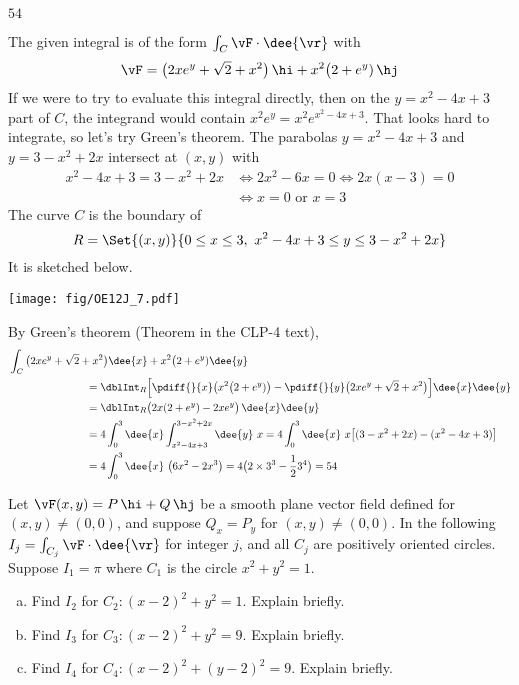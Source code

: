 \begin{answer}
$54$
\end{answer}

\begin{solution}
The given integral is of the form $\int_C \vF\cdot\dee{\vr}$
with
\begin{equation*}
\vF = \big(2xe^y + \sqrt{2} + x^2\big)\,\hi
      + x^2 \big(2 + e^y)\,\hj
\end{equation*}
If we were to try to evaluate this integral directly, then on the
$y=x^2-4x+3$ part of $C$, the
integrand would contain $x^2 e^y = x^2 e^{x^2-4x+3}$. That looks hard to integrate, so let's try Green's theorem.
The parabolas $y = x^2 - 4x + 3$ and $y = 3 - x^2 + 2x$
intersect at $(x,y)$ with
\begin{align*}
x^2 - 4x + 3 = 3 - x^2 + 2x
&\iff
2x^2 -6x = 0
\iff
2x(x-3)=0 \\
&\iff
x=0\text{ or }x=3
\end{align*}
The curve $C$ is the boundary
of
\begin{equation*}
R= \Set{(x,y)}{0\le x\le 3,\ x^2 - 4x + 3 \le y\le  3 - x^2 + 2x}
\end{equation*}
It is sketched below.
\begin{center}
     \texttt{[image: fig/OE12J\_7.pdf]}
\end{center}
By Green's theorem  (Theorem  in the CLP-4 text),
\begin{align*}
&\int_C \big(2xe^y + \sqrt{2} + x^2\big)\dee{x}
      + x^2 \big(2 + e^y)\dee{y} \\
&\hskip1in
= \dblInt_R\Big[\pdiff{}{x}\big(x^2 \big(2 + e^y)\big)
-\pdiff{}{y}\big(2xe^y + \sqrt{2} + x^2\big)\Big] \dee{x}\dee{y}
\\
&\hskip1in = \dblInt_R \big(2x(2+e^y) - 2xe^y\big)\,\dee{x}\dee{y} \\
&\hskip1in =4 \int_0^3\dee{x}\int_{x^2 - 4x + 3}^{3 - x^2 + 2x}\dee{y}\  x
=4 \int_0^3\dee{x}\ x\big[(3 - x^2 + 2x) - (x^2 - 4x + 3)\big]\\
&\hskip1in =4 \int_0^3\dee{x}\ \big(6x^2-2x^3\big)
= 4\big(2\times 3^3-\frac{1}{2}3^4\big)
=54
\end{align*}
\end{solution}

\begin{question}[M317 2016D] %
Let $\vF(x, y) = P \,\hi + Q\,\hj$ be a smooth plane vector field
defined for $(x,y) \ne (0, 0)$, and suppose $Q_x = P_y$ for
$(x,y) \ne  (0, 0)$. In the following $I_j = \int_{C_j} \vF\cdot\dee{\vr}$
for integer $j$, and all $C_j$ are positively oriented circles. Suppose
$I_1 = \pi$ where $C_1$ is the circle $x^2 + y^2 = 1$.
\begin{enumerate}[(a)]
\item
Find $I_2$ for $C_2 : (x - 2)^2 + y^2 = 1$. Explain briefly.
\item
Find $I_3$ for $C_3 : (x - 2)^2 + y^2 = 9$. Explain briefly.
\item
Find $I_4$ for $C_4 : (x - 2)^2 + (y-2)^2 = 9$. Explain briefly.
\end{enumerate}
\end{question}

